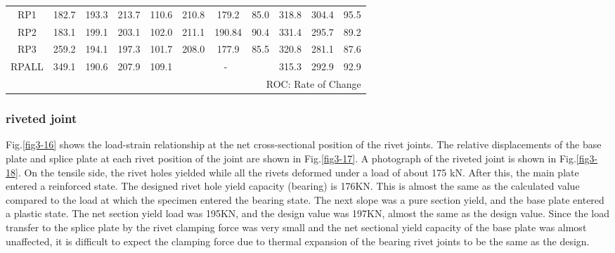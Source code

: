 \begin{table}[]
{\begin{tabular}{@{}ccccccccccc@{}}
    RP1                   & 182.7                 & 193.3     & 213.7     & 110.6     & 210.8       & 179.2        & 85.0       & 318.8       & 304.4       & 95.5      \\
    RP2                   & 183.1                 & 199.1     & 203.1     & 102.0     & 211.1       & 190.84       & 90.4       & 331.4       & 295.7       & 89.2      \\
    RP3                   & 259.2                 & 194.1     & 197.3     & 101.7     & 208.0       & 177.9        & 85.5       & 320.8       & 281.1       & 87.6      \\
    RPALL                 & 349.1                 & 190.6     & 207.9     & 109.1     & \multicolumn{3}{c}{-}                   & 315.3       & 292.9       & 92.9      \\ \midrule
    \multicolumn{11}{r}{ROC: Rate of Change}                                                                                                                           
    \end{tabular}}
\end{table}

\subsubsection{riveted joint}

Fig.\ref{fig3-16} shows the load-strain relationship at the net cross-sectional position of the rivet joints. The relative displacements of the base plate and splice plate at each rivet position of the joint are shown in Fig.\ref{fig3-17}. A photograph of the riveted joint is shown in Fig.\ref{fig3-18}. On the tensile side, the rivet holes yielded while all the rivets deformed under a load of about 175 kN. After this, the main plate entered a reinforced state. The designed rivet hole yield capacity (bearing) is 176KN. This is almost the same as the calculated value compared to the load at which the specimen entered the bearing state. The next slope was a pure section yield, and the base plate entered a plastic state. The net section yield load was 195KN, and the design value was 197KN, almost the same as the design value. Since the load transfer to the splice plate by the rivet clamping force was very small and the net sectional yield capacity of the base plate was almost unaffected, it is difficult to expect the clamping force due to thermal expansion of the bearing rivet joints to be the same as the design.

